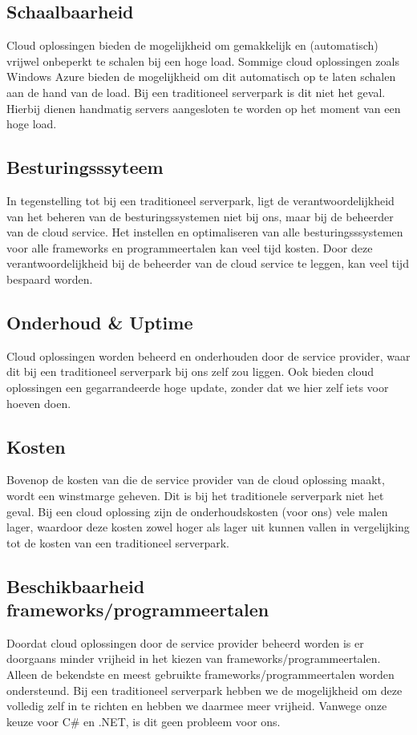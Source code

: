 \subsection{Schaalbaarheid}
Cloud oplossingen bieden de mogelijkheid om gemakkelijk en (automatisch) vrijwel onbeperkt te schalen bij een hoge load. Sommige cloud oplossingen zoals Windows Azure bieden de mogelijkheid om dit automatisch op te laten schalen aan de hand van de load. Bij een traditioneel serverpark is dit niet het geval. Hierbij dienen handmatig servers aangesloten te worden op het moment van een hoge load. 


\subsection{Besturingsssyteem}
In tegenstelling tot bij een traditioneel serverpark, ligt de verantwoordelijkheid van het beheren van de besturingssystemen niet bij ons, maar bij de beheerder van de cloud service. Het instellen en optimaliseren van alle besturingsssystemen voor alle frameworks en programmeertalen kan veel tijd kosten. Door deze verantwoordelijkheid bij de beheerder van de cloud service te  leggen, kan veel tijd bespaard worden.

\subsection{Onderhoud \& Uptime}
Cloud oplossingen worden beheerd en onderhouden door de service provider, waar dit bij een traditioneel serverpark bij ons zelf zou liggen. Ook bieden cloud oplossingen een gegarrandeerde hoge update, zonder dat we hier zelf iets voor hoeven doen.

\subsection{Kosten}
Bovenop de kosten van die de service provider van de cloud oplossing maakt, wordt een winstmarge geheven. Dit is bij het traditionele serverpark niet het geval. Bij een cloud oplossing zijn de onderhoudskosten (voor ons) vele malen lager, waardoor deze kosten zowel hoger als lager uit kunnen vallen in vergelijking tot de kosten van een traditioneel serverpark.

\subsection{Beschikbaarheid frameworks/programmeertalen}
Doordat cloud oplossingen door de service provider beheerd worden is er doorgaans minder vrijheid in het kiezen van frameworks/programmeertalen. Alleen de bekendste en meest gebruikte frameworks/programmeertalen worden ondersteund. Bij een traditioneel serverpark hebben we de mogelijkheid om deze volledig zelf in te richten en hebben we daarmee meer vrijheid. Vanwege onze keuze voor C\# en .NET, is dit geen probleem voor ons.

